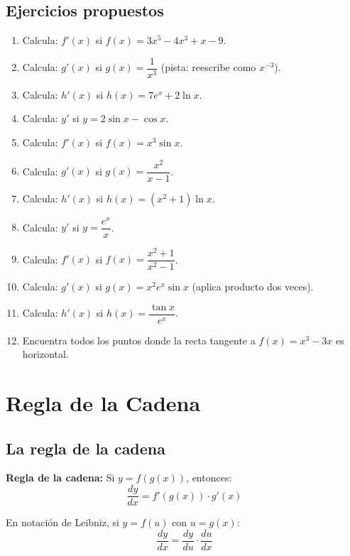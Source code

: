 \documentclass[12pt, a4paper]{article}
\begin{document}
\newpage

\subsection{Ejercicios propuestos}

\begin{enumerate}[leftmargin=*, resume]
  \item \facil{} Calcula: $f'(x)$ si $f(x) = 3x^5 - 4x^3 + x - 9$.
  \item \facil{} Calcula: $g'(x)$ si $g(x) = \dfrac{1}{x^3}$ (pista: reescribe como $x^{-3}$).
  \item \facil{} Calcula: $h'(x)$ si $h(x) = 7e^x + 2\ln x$.
  \item \facil{} Calcula: $y'$ si $y = 2\sin x - \cos x$.
  \item \medio{} Calcula: $f'(x)$ si $f(x) = x^3 \sin x$.
  \item \medio{} Calcula: $g'(x)$ si $g(x) = \dfrac{x^2}{x - 1}$.
  \item \medio{} Calcula: $h'(x)$ si $h(x) = (x^2 + 1) \ln x$.
  \item \medio{} Calcula: $y'$ si $y = \dfrac{e^x}{x}$.
  \item \dificil{} Calcula: $f'(x)$ si $f(x) = \dfrac{x^2 + 1}{x^2 - 1}$.
  \item \dificil{} Calcula: $g'(x)$ si $g(x) = x^2 e^x \sin x$ (aplica producto dos veces).
  \item \dificil{} Calcula: $h'(x)$ si $h(x) = \dfrac{\tan x}{e^x}$.
  \item \dificil{} Encuentra todos los puntos donde la recta tangente a $f(x) = x^3 - 3x$ es horizontal.
\end{enumerate}

\newpage

\section{Regla de la Cadena}

\subsection{La regla de la cadena}

\begin{cuadroteoria}
  \textbf{Regla de la cadena:} Si $y = f(g(x))$, entonces:
  $$\frac{dy}{dx} = f'(g(x)) \cdot g'(x)$$

  En notación de Leibniz, si $y = f(u)$ con $u = g(x)$:
  $$\frac{dy}{dx} = \frac{dy}{du} \cdot \frac{du}{dx}$$
\end{cuadroteoria}
\end{document}
